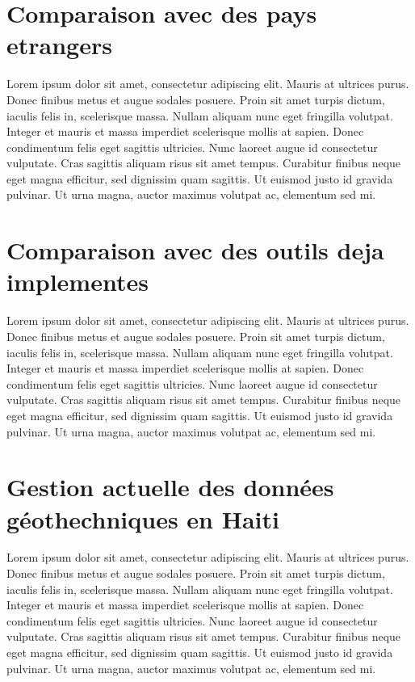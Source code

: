     \section{Comparaison avec des pays etrangers}
    Lorem ipsum dolor sit amet, consectetur adipiscing elit. Mauris at ultrices purus. Donec finibus metus et augue sodales posuere. Proin sit amet turpis dictum, iaculis felis in, scelerisque massa. Nullam aliquam nunc eget fringilla volutpat. Integer et mauris et massa imperdiet scelerisque mollis at sapien. Donec condimentum felis eget sagittis ultricies. Nunc laoreet augue id consectetur vulputate. Cras sagittis aliquam risus sit amet tempus. Curabitur finibus neque eget magna efficitur, sed dignissim quam sagittis. Ut euismod justo id gravida pulvinar. Ut urna magna, auctor maximus volutpat ac, elementum sed mi.
    \section{Comparaison avec des outils deja implementes}
    Lorem ipsum dolor sit amet, consectetur adipiscing elit. Mauris at ultrices purus. Donec finibus metus et augue sodales posuere. Proin sit amet turpis dictum, iaculis felis in, scelerisque massa. Nullam aliquam nunc eget fringilla volutpat. Integer et mauris et massa imperdiet scelerisque mollis at sapien. Donec condimentum felis eget sagittis ultricies. Nunc laoreet augue id consectetur vulputate. Cras sagittis aliquam risus sit amet tempus. Curabitur finibus neque eget magna efficitur, sed dignissim quam sagittis. Ut euismod justo id gravida pulvinar. Ut urna magna, auctor maximus volutpat ac, elementum sed mi.
    \section{Gestion actuelle des données géothechniques en Haiti}
    Lorem ipsum dolor sit amet, consectetur adipiscing elit. Mauris at ultrices purus. Donec finibus metus et augue sodales posuere. Proin sit amet turpis dictum, iaculis felis in, scelerisque massa. Nullam aliquam nunc eget fringilla volutpat. Integer et mauris et massa imperdiet scelerisque mollis at sapien. Donec condimentum felis eget sagittis ultricies. Nunc laoreet augue id consectetur vulputate. Cras sagittis aliquam risus sit amet tempus. Curabitur finibus neque eget magna efficitur, sed dignissim quam sagittis. Ut euismod justo id gravida pulvinar. Ut urna magna, auctor maximus volutpat ac, elementum sed mi.
   
